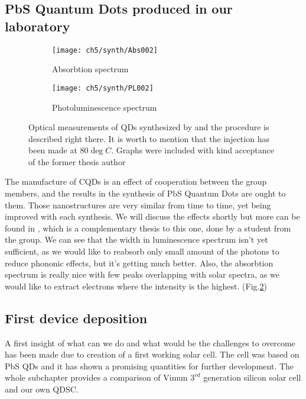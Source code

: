 \subsection{PbS Quantum Dots produced in our laboratory}

\begin{figure}
\centering
\begin{subfigure}[b]{0.7\textwidth}
\centering
\texttt{[image: ch5/synth/Abs002]}
\caption{Absorbtion spectrum}
\end{subfigure}

\hfill

\begin{subfigure}[b]{0.7\textwidth}
\centering
\texttt{[image: ch5/synth/PL002]}
\caption{Photoluminescence spectrum}
\label{fig:synth}
\end{subfigure}

\caption{Optical measurements of QDs synthesized by \cite{swietek} and the procedure is described right there. It is worth to mention that the injection has been made at 80$\deg C$. Graphs were included with kind acceptance of the former thesis author}
\end{figure}

The manufacture of CQDs is an effect of cooperation between the group members, and the results in the synthesis of PbS Quantum Dots are ought to them. Those nanostructures are very similar from time to time, yet being improved with each synthesis. We will discuss the effects shortly but more can be found in \cite{swietek}, which is a complementary thesis to this one, done by a student from the group. We can see that the width in luminescence spectrum isn't yet sufficient, as we would like to reabsorb only small amount of the photons to reduce phononic effects, but it's getting much better. Also, the absorbtion spectrum is really nice with few peaks overlapping with solar spectra, as we would like to extract electrons where the intensity is the highest. (Fig.\ref{fig:synth}) 


\subsection{First device deposition}

A first insight of what can we do and what would be the challenges to overcome has been made due to creation of a first working solar cell. The cell was based on PbS QDs and it has shown a promising quantities for further development. The whole subchapter provides a comparison of Vimun $3^{rd}$ generation silicon solar cell and our own QDSC.


